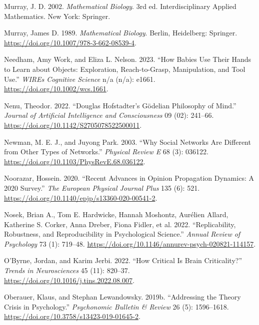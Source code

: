 \documentclass[
  a4paper,
  DIV=11,
  numbers=noendperiod]{scrreprt}
\newlength{\cslhangindent}
\newlength{\cslentryspacingunit} %
\newenvironment{CSLReferences}[2] %
 {%
  \setlength{\parindent}{0pt}
  \ifodd #1
  \let\oldpar\par
  \def\par{\hangindent=\cslhangindent\oldpar}
  \fi
  \setlength{\parskip}{#2\cslentryspacingunit}
 }%
 {}
\begin{document}
\begin{CSLReferences}{1}{0}
\leavevmode{}%
Murray, J. D. 2002. \emph{Mathematical Biology}. 3rd ed.
Interdisciplinary Applied Mathematics. {New York}: {Springer}.

\leavevmode{}%
Murray, James D. 1989. \emph{Mathematical Biology}. Berlin, Heidelberg:
Springer. \url{https://doi.org/10.1007/978-3-662-08539-4}.

\leavevmode{}%
Needham, Amy Work, and Eliza L. Nelson. 2023. {``How Babies Use Their
Hands to Learn about Objects: {Exploration}, Reach-to-Grasp,
Manipulation, and Tool Use.''} \emph{WIREs Cognitive Science} n/a (n/a):
e1661. \url{https://doi.org/10.1002/wcs.1661}.

\leavevmode{}%
Nenu, Theodor. 2022. {``Douglas Hofstadter{'}s Gödelian Philosophy of
Mind.''} \emph{Journal of Artificial Intelligence and Consciousness} 09
(02): 241--66. \url{https://doi.org/10.1142/S2705078522500011}.

\leavevmode{}%
Newman, M. E. J., and Juyong Park. 2003. {``Why Social Networks Are
Different from Other Types of Networks.''} \emph{Physical Review E} 68
(3): 036122. \url{https://doi.org/10.1103/PhysRevE.68.036122}.

\leavevmode{}%
Noorazar, Hossein. 2020. {``Recent Advances in Opinion Propagation
Dynamics: A 2020 Survey.''} \emph{The European Physical Journal Plus}
135 (6): 521. \url{https://doi.org/10.1140/epjp/s13360-020-00541-2}.

\leavevmode{}%
Nosek, Brian A., Tom E. Hardwicke, Hannah Moshontz, Aurélien Allard,
Katherine S. Corker, Anna Dreber, Fiona Fidler, et al. 2022.
{``Replicability, {Robustness}, and {Reproducibility} in {Psychological
Science}.''} \emph{Annual Review of Psychology} 73 (1): 719--48.
\url{https://doi.org/10.1146/annurev-psych-020821-114157}.

\leavevmode{}%
O'Byrne, Jordan, and Karim Jerbi. 2022. {``How Critical Is Brain
Criticality?''} \emph{Trends in Neurosciences} 45 (11): 820--37.
\url{https://doi.org/10.1016/j.tins.2022.08.007}.

\leavevmode{}%
Oberauer, Klaus, and Stephan Lewandowsky. 2019b. {``Addressing the
Theory Crisis in Psychology.''} \emph{Psychonomic Bulletin \& Review} 26
(5): 1596--1618. \url{https://doi.org/10.3758/s13423-019-01645-2}.


\end{CSLReferences}
\end{document}
